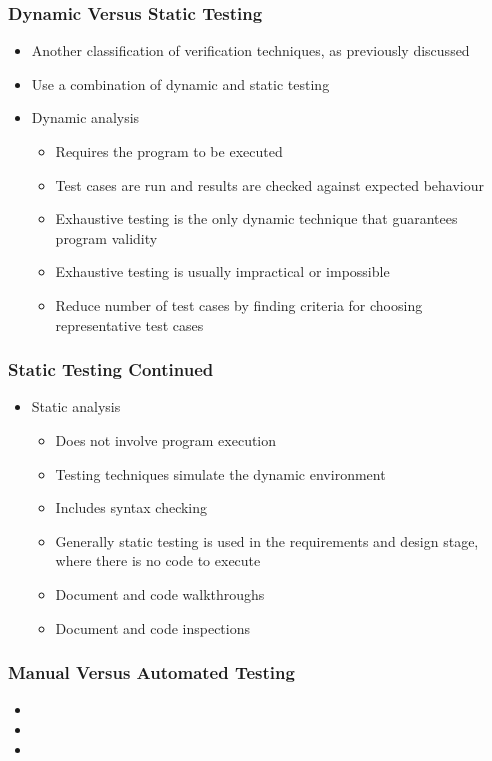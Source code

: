 \documentclass[t,12pt,numbers,fleqn]{beamer}
\begin{document}

\begin{frame}
\frametitle{Dynamic Versus Static Testing}
\begin{itemize}
\item Another classification of verification techniques, as previously discussed
\item Use a combination of dynamic and static testing
\item Dynamic analysis
\begin{itemize}
\item Requires the program to be executed
\item Test cases are run and results are checked against expected behaviour
\item Exhaustive testing is the only dynamic technique that guarantees program
validity
\item Exhaustive testing is usually impractical or impossible
\item Reduce number of test cases by finding criteria for choosing representative test cases
\end{itemize}
\end{itemize}
\end{frame}


\begin{frame}
\frametitle{Static Testing Continued}
\begin{itemize}
\item Static analysis
\begin{itemize}
\item Does not involve program execution
\item Testing techniques simulate the dynamic environment
\item Includes syntax checking
\item Generally static testing is used in the requirements and design stage, where there is no code to execute
\item Document and code walkthroughs
\item Document and code inspections
\end{itemize}
\end{itemize}
\end{frame}
 

\begin{frame}
\frametitle{Manual Versus Automated Testing}
\begin{itemize}
\item {}
\item {}
\item {}
\end{itemize}
\end{frame}
\end{document}

